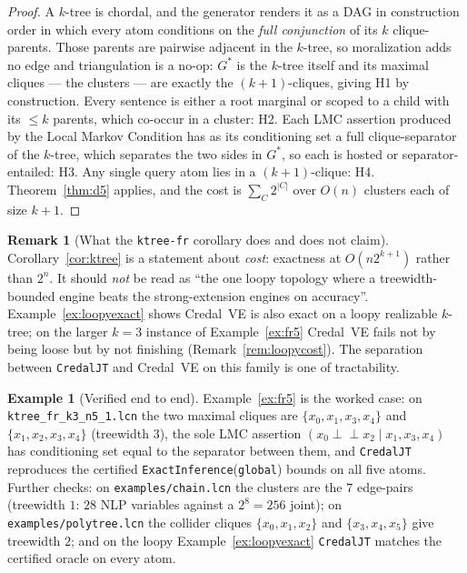 \documentclass[11pt]{article}
\theoremstyle{definition}
\newtheorem{example}{Example}
\newtheorem{remark}{Remark}
\newcommand{\indep}{\perp\!\!\!\perp}
\begin{document}
\begin{proof}
A $k$-tree is chordal, and the generator renders it as a DAG in construction order in which every atom
conditions on the \emph{full conjunction} of its $k$ clique-parents. Those parents are pairwise
adjacent in the $k$-tree, so moralization adds no edge and triangulation is a no-op: $G^\ast$ is the
$k$-tree itself and its maximal cliques --- the clusters --- are exactly the $(k{+}1)$-cliques, giving
H1 by construction. Every sentence is either a root marginal or scoped to a child with its $\le k$
parents, which co-occur in a cluster: H2. Each LMC assertion produced by the Local Markov Condition
has as its conditioning set a full clique-separator of the $k$-tree, which separates the two sides in
$G^\ast$, so each is hosted or separator-entailed: H3. Any single query atom lies in a
$(k{+}1)$-clique: H4. Theorem~\ref{thm:d5} applies, and the cost is $\sum_C2^{|C|}$ over $O(n)$
clusters each of size $k{+}1$.
\end{proof}

\begin{remark}[What the \texttt{ktree-fr} corollary does and does not claim]\label{rem:ktreehonest}
Corollary~\ref{cor:ktree} is a statement about \emph{cost}: exactness at $O(n2^{k+1})$ rather than
$2^n$. It should \emph{not} be read as ``the one loopy topology where a treewidth-bounded engine beats
the strong-extension engines on accuracy''. Example~\ref{ex:loopyexact} shows Credal~VE is also exact
on a loopy realizable $k$-tree; on the larger $k{=}3$ instance of Example~\ref{ex:fr5} Credal~VE fails
not by being loose but by not finishing (Remark~\ref{rem:loopycost}). The separation between
\texttt{CredalJT} and Credal~VE on this family is one of tractability.
\end{remark}

\begin{example}[Verified end to end]\label{ex:d5verified}
Example~\ref{ex:fr5} is the worked case: on \texttt{ktree\_fr\_k3\_n5\_1.lcn} the two maximal cliques
are $\{x_0,x_1,x_3,x_4\}$ and $\{x_1,x_2,x_3,x_4\}$ (treewidth $3$), the sole LMC assertion
$(x_0\indep x_2\mid x_1,x_3,x_4)$ has conditioning set equal to the separator between them, and
\texttt{CredalJT} reproduces the certified \texttt{ExactInference}(\texttt{global}) bounds on all five
atoms. Further checks: on \texttt{examples/chain.lcn} the clusters are the $7$ edge-pairs
(treewidth $1$: $28$ NLP variables against a $2^8=256$ joint); on \texttt{examples/polytree.lcn} the
collider cliques $\{x_0,x_1,x_2\}$ and $\{x_3,x_4,x_5\}$ give treewidth $2$; and on the loopy
Example~\ref{ex:loopyexact} \texttt{CredalJT} matches the certified oracle on every atom.
\end{example}
\end{document}
